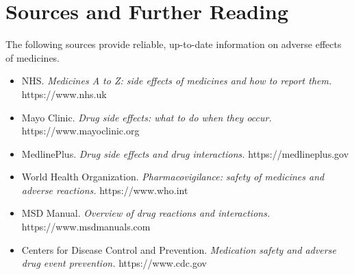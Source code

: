 \section*{Sources and Further Reading}
The following sources provide reliable, up-to-date information on adverse effects of medicines.

\begin{itemize}
    \item NHS. \textit{Medicines A to Z: side effects of medicines and how to report them.} https://www.nhs.uk
    \item Mayo Clinic. \textit{Drug side effects: what to do when they occur.} https://www.mayoclinic.org
    \item MedlinePlus. \textit{Drug side effects and drug interactions.} https://medlineplus.gov
    \item World Health Organization. \textit{Pharmacovigilance: safety of medicines and adverse reactions.} https://www.who.int
    \item MSD Manual. \textit{Overview of drug reactions and interactions.} https://www.msdmanuals.com
    \item Centers for Disease Control and Prevention. \textit{Medication safety and adverse drug event prevention.} https://www.cdc.gov
\end{itemize}

